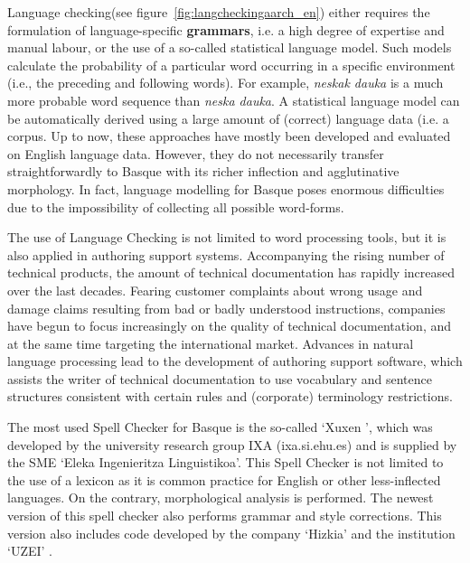 \begin{multicols}{2}
Language checking(see figure~\ref{fig:langcheckingaarch_en}) either requires the formulation of language-specific 
\textbf{grammars}, i.e. a high degree of expertise and manual labour, or the use of a so-called statistical 
language model.  Such models calculate the probability of a particular word occurring in a specific environment (i.e., the preceding and following words). For example, \textit{neskak dauka} is a much more probable word sequence than \textit{neska dauka}. A statistical language model can be automatically derived using a large amount of (correct) language data (i.e. a 
corpus. Up to now, these approaches have mostly been developed and evaluated on English language data. However, they do not necessarily transfer straightforwardly to Basque with its richer inflection and agglutinative morphology. In fact, language modelling for Basque poses enormous difficulties due to the impossibility of collecting all possible word-forms.  

The use of Language Checking is not limited to word processing tools, but it is also applied in authoring support systems. Accompanying the rising number of technical products, the amount of technical documentation has rapidly increased over the last decades. Fearing customer complaints about wrong usage and damage claims resulting from bad or badly understood instructions, companies have begun to focus increasingly on the quality of technical documentation, and at the same time targeting the international market. Advances in natural language processing lead to the development of authoring support software, which assists the writer of technical documentation to use vocabulary and sentence structures consistent with certain rules and (corporate) terminology restrictions. 


The most used Spell Checker for Basque is the so-called ‘Xuxen \cite{BAS-Nota24}’, which was developed by the university research group IXA (ixa.si.ehu.es) and is supplied by the SME ‘Eleka Ingenieritza Linguistikoa’. This Spell Checker is not limited to the use of a lexicon as it is common practice for English or other less-inflected languages. On the contrary, morphological analysis is performed. The newest version of this spell checker also performs grammar and style corrections. This version also includes code developed by the company ‘Hizkia’ \cite{BAS-Nota25} and the institution ‘UZEI’ \cite{BAS-Nota26}. 


\end{multicols}
